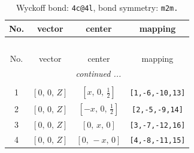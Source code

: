 \documentclass[fleqn,8pt]{jsarticle}
\begin{document}
\renewcommand{\arraystretch}{1.2}
\begin{longtable}{cccc}
\caption{Wyckoff bond: {\tt 4c@4l}, bond symmetry: {\tt m2m.}}
 \\
 \hline \hline
No. & vector & center & mapping \\ \hline \endfirsthead

\multicolumn{3}{l}{\tablename\ \thetable{}} \\
 \hline \hline
No. & vector & center & mapping \\ \hline \endhead

 \hline \hline
\multicolumn{3}{r}{\footnotesize\it continued ...} \\ \endfoot

 \hline \hline
\multicolumn{3}{r}{} \\ \endlastfoot

1 & $\left[ 0,\, 0,\, Z \right]$ & $\left[ x,\, 0,\, \frac{1}{2} \right]$ & {\tt [1,-6,-10,13]} \\ \hline
2 & $\left[ 0,\, 0,\, Z \right]$ & $\left[ - x,\, 0,\, \frac{1}{2} \right]$ & {\tt [2,-5,-9,14]} \\ \hline
3 & $\left[ 0,\, 0,\, Z \right]$ & $\left[ 0,\, x,\, 0 \right]$ & {\tt [3,-7,-12,16]} \\ \hline
4 & $\left[ 0,\, 0,\, Z \right]$ & $\left[ 0,\, - x,\, 0 \right]$ & {\tt [4,-8,-11,15]} \\
\end{longtable}
\renewcommand{\arraystretch}{1.2}
\end{document}
